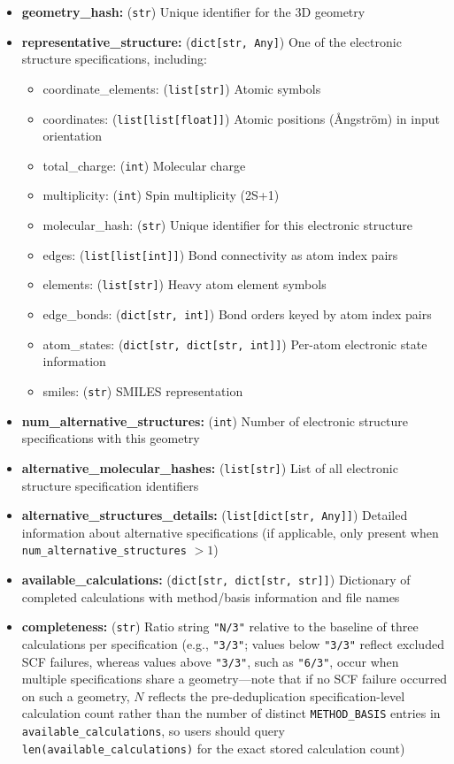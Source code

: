 \documentclass[fleqn,10pt]{article}
\begin{document}
\begin{itemize}
\item \textbf{geometry\_hash:} (\texttt{str}) Unique identifier for the 3D geometry
\item \textbf{representative\_structure:} (\texttt{dict[str, Any]}) One of the electronic structure specifications, including:
  \begin{itemize}
  \item coordinate\_elements: (\texttt{list[str]}) Atomic symbols
  \item coordinates: (\texttt{list[list[float]]}) Atomic positions (\AA ngström) in input orientation
  \item total\_charge: (\texttt{int}) Molecular charge
  \item multiplicity: (\texttt{int}) Spin multiplicity (2S+1)
  \item molecular\_hash: (\texttt{str}) Unique identifier for this electronic structure
  \item edges: (\texttt{list[list[int]]}) Bond connectivity as atom index pairs
  \item elements: (\texttt{list[str]}) Heavy atom element symbols
  \item edge\_bonds: (\texttt{dict[str, int]}) Bond orders keyed by atom index pairs
  \item atom\_states: (\texttt{dict[str, dict[str, int]]}) Per-atom electronic state information
  \item smiles: (\texttt{str}) SMILES representation
  \end{itemize}
\item \textbf{num\_alternative\_structures:} (\texttt{int}) Number of electronic structure specifications with this geometry
\item \textbf{alternative\_molecular\_hashes:} (\texttt{list[str]}) List of all electronic structure specification identifiers
\item \textbf{alternative\_structures\_details:} (\texttt{list[dict[str, Any]]}) Detailed information about alternative specifications (if applicable, only present when \texttt{num\_\allowbreak{}alternative\_\allowbreak{}structures} $>1$)
\item \textbf{available\_calculations:} (\texttt{dict[str, dict[str, str]]}) Dictionary of completed calculations with method/basis information and file names
\item \textbf{completeness:} (\texttt{str}) Ratio string \texttt{"N/3"} relative to the baseline of three calculations per specification (e.g., \texttt{"3/3"}; values below \texttt{"3/3"} reflect excluded SCF failures, whereas values above \texttt{"3/3"}, such as \texttt{"6/3"}, occur when multiple specifications share a geometry---note that if no SCF failure occurred on such a geometry, $N$ reflects the pre-deduplication specification-level calculation count rather than the number of distinct \texttt{METHOD\_\allowbreak{}BASIS} entries in \texttt{available\_\allowbreak{}calculations}, so users should query \texttt{len(available\_\allowbreak{}calculations)} for the exact stored calculation count)

\end{itemize}
\end{document}
